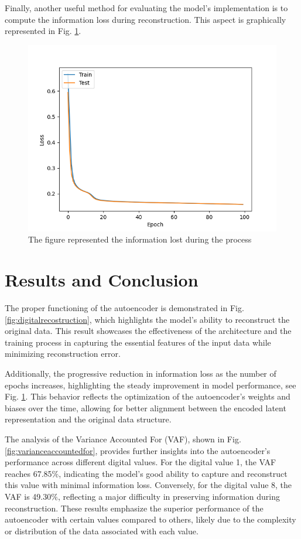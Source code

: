 \documentclass[9pt,technote]{IEEEtran}
\begin{document}
Finally, another useful method for evaluating the model's implementation is to compute the information loss during reconstruction. This aspect is graphically represented in Fig. \ref{fig:autoencodermodelloss}.
\begin{figure}
	\centering
	\includegraphics[width=0.7\linewidth]{Resources/AutoencoderModelLoss}
	\caption{The figure represented the information lost during the process}
	\label{fig:autoencodermodelloss}
\end{figure}

\section{Results and Conclusion}
The proper functioning of the autoencoder is demonstrated in Fig. \ref{fig:digitalrecostruction}, which highlights the model's ability to reconstruct the original data. This result showcases the effectiveness of the architecture and the training process in capturing the essential features of the input data while minimizing reconstruction error.

Additionally, the progressive reduction in information loss as the number of epochs increases, highlighting the steady improvement in model performance, see Fig. \ref{fig:autoencodermodelloss}. This behavior reflects the optimization of the autoencoder's weights and biases over the time, allowing for better alignment between the encoded latent representation and the original data structure.

The analysis of the Variance Accounted For (VAF), shown in Fig. \ref{fig:varianceaccountedfor}, provides further insights into the autoencoder's performance across different digital values. For the digital value 1, the VAF reaches 67.85$\%$, indicating the model's good ability to capture and reconstruct this value with minimal information loss. Conversely, for the digital value 8, the VAF is 49.30$\%$, reflecting a major difficulty in preserving information during reconstruction. These results emphasize the superior performance of the autoencoder with certain values compared to others, likely due to the complexity or distribution of the data associated with each value.
\end{document}

